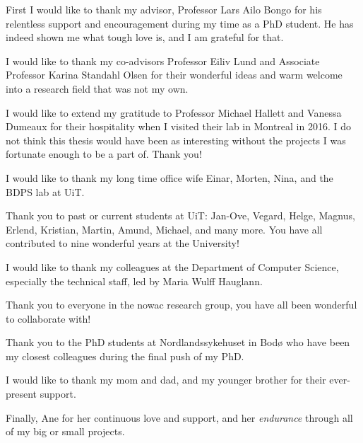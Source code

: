 \begin{acknowledgement}
    First I would like to thank my advisor, Professor Lars Ailo Bongo for his
    relentless support and encouragement during my time as a PhD student. He has
    indeed shown me what tough love is, and I am grateful for that. 

    I would like to thank my co-advisors Professor Eiliv Lund and Associate
    Professor Karina Standahl Olsen for their wonderful ideas and warm welcome
    into a research field that was not my own. 

    I would like to extend my gratitude to Professor Michael Hallett and Vanessa
    Dumeaux for their hospitality when I visited their lab in Montreal in
    2016. I do not think this thesis would have been as interesting without the
    projects I was fortunate enough to be a part of. Thank you! 

    I would like to thank my long time office wife Einar, Morten, Nina, and
    the BDPS lab at UiT. 

    Thank you to past or current students at UiT: Jan-Ove, Vegard, Helge,
    Magnus, Erlend, Kristian, Martin, Amund, Michael, and many more. You have
    all contributed to nine wonderful years at the University!
    
    I would like to thank my colleagues at the Department of Computer Science,
    especially the technical staff, led by Maria Wulff Hauglann.
    
    Thank you to everyone in the \gls{nowac} research group, you have all been
    wonderful to collaborate with! 

    Thank you to the PhD students at Nordlandssykehuset in Bodø who have been my
    closest colleagues during the final push of my PhD. 
    
    I would like to thank my mom and dad, and my younger brother for their
    ever-present support. 

    Finally, Ane for her continuous love and support, and her
    \emph{endurance} through all of my big or small projects. 
\end{acknowledgement}
